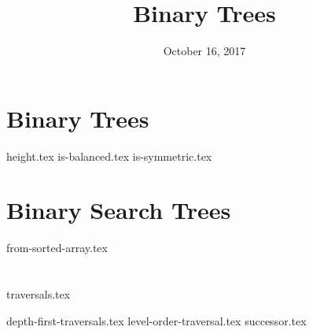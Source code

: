 \documentclass[11pt]{exam}
\title{Binary Trees}
\date{October 16, 2017}
\begin{document}
\maketitle

\section{Binary Trees}
\begin{questions}
{height.tex}
{is-balanced.tex}
\clearpage
{}\vspace*{-2em}
{is-symmetric.tex}
\end{questions}

\clearpage

\section{Binary Search Trees}
\begin{questions}
{from-sorted-array.tex}
\end{questions}

\clearpage

\section{}
{traversals.tex}
\begin{questions}
{depth-first-traversals.tex}
{level-order-traversal.tex}
{successor.tex}
\end{questions}
\end{document}
